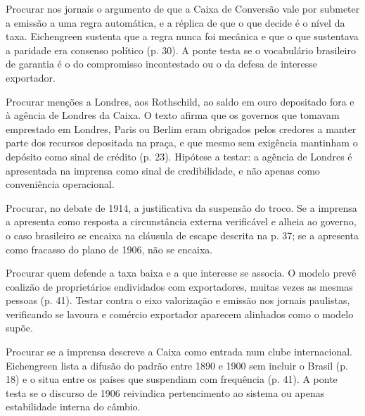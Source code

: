 \begin{dialogo}
\item Procurar nos jornais o argumento de que a Caixa de Conversão vale por
submeter a emissão a uma regra automática, e a réplica de que o que decide é o
nível da taxa. Eichengreen sustenta que a regra nunca foi mecânica e que o que
sustentava a paridade era consenso político (p. 30). A ponte testa se o
vocabulário brasileiro de garantia é o do compromisso incontestado ou o da
defesa de interesse exportador.
\item Procurar menções a Londres, aos Rothschild, ao saldo em ouro depositado
fora e à agência de Londres da Caixa. O texto afirma que os governos que tomavam
emprestado em Londres, Paris ou Berlim eram obrigados pelos credores a manter
parte dos recursos depositada na praça, e que mesmo sem exigência mantinham o
depósito como sinal de crédito (p. 23). Hipótese a testar: a agência de Londres
é apresentada na imprensa como sinal de credibilidade, e não apenas como
conveniência operacional.
\item Procurar, no debate de 1914, a justificativa da suspensão do troco. Se a
imprensa a apresenta como resposta a circunstância externa verificável e alheia
ao governo, o caso brasileiro se encaixa na cláusula de escape descrita na
p. 37; se a apresenta como fracasso do plano de 1906, não se encaixa.
\item Procurar quem defende a taxa baixa e a que interesse se associa. O modelo
prevê coalizão de proprietários endividados com exportadores, muitas vezes as
mesmas pessoas (p. 41). Testar contra o eixo valorização e emissão nos jornais
paulistas, verificando se lavoura e comércio exportador aparecem alinhados como
o modelo supõe.
\item Procurar se a imprensa descreve a Caixa como entrada num clube
internacional. Eichengreen lista a difusão do padrão entre 1890 e 1900 sem
incluir o Brasil (p. 18) e o situa entre os países que suspendiam com frequência
(p. 41). A ponte testa se o discurso de 1906 reivindica pertencimento ao sistema
ou apenas estabilidade interna do câmbio.
\end{dialogo}


